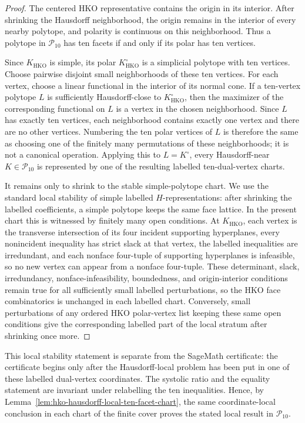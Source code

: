 \begin{proof}
The centered HKO representative contains the origin in its interior. After
shrinking the Hausdorff neighborhood, the origin remains in the interior of
every nearby polytope, and polarity is continuous on this neighborhood. Thus a
polytope in \(\mathcal P_{10}\) has ten facets if and only if its polar has ten
vertices.

Since \(K_{\mathrm{HKO}}\) is simple, its polar
\(K_{\mathrm{HKO}}^\circ\) is a simplicial polytope with ten vertices. Choose
pairwise disjoint small neighborhoods of these ten vertices. For each vertex,
choose a linear functional in the interior of its normal cone. If a ten-vertex
polytope \(L\) is sufficiently Hausdorff-close to \(K_{\mathrm{HKO}}^\circ\),
then the maximizer of the corresponding functional on \(L\) is a vertex in the
chosen neighborhood. Since \(L\) has exactly ten vertices, each neighborhood
contains exactly one vertex and there are no other vertices. Numbering the ten
polar vertices of \(L\) is therefore the same as choosing one of the finitely
many permutations of these neighborhoods; it is not a canonical operation.
Applying this to \(L=K^\circ\), every Hausdorff-near
\(K\in\mathcal P_{10}\) is represented by one of the resulting labelled
ten-dual-vertex charts.

It remains only to shrink to the stable simple-polytope chart. We use the
standard local stability of simple labelled \(H\)-representations: after
shrinking the labelled coefficients, a simple polytope keeps the same face
lattice. In the present chart this is witnessed by finitely many open
conditions. At \(K_{\mathrm{HKO}}\), each vertex is the transverse intersection
of its four incident supporting hyperplanes, every nonincident inequality has
strict slack at that vertex, the labelled inequalities are irredundant, and
each nonface four-tuple of supporting hyperplanes is infeasible, so no new
vertex can appear from a nonface four-tuple. These determinant, slack,
irredundancy, nonface-infeasibility, boundedness, and origin-interior
conditions remain true for all sufficiently small labelled perturbations, so the
HKO face combinatorics is unchanged in each labelled chart. Conversely, small
perturbations of any ordered HKO polar-vertex list keeping these same open
conditions give the corresponding labelled part of the local stratum after
shrinking once more.
\end{proof}

This local stability statement is separate from the SageMath certificate: the
certificate begins only after the Hausdorff-local problem has been put in one of
these labelled dual-vertex coordinates. The systolic ratio and the equality
statement are invariant under relabelling the ten inequalities. Hence, by
Lemma~\ref{lem:hko-hausdorff-local-ten-facet-chart}, the same coordinate-local
conclusion in each chart of the finite cover proves the stated local result in
\(\mathcal P_{10}\).


